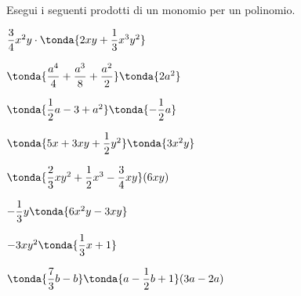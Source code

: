 \begin{esercizio}
\label{ese:10.16}
Esegui i seguenti prodotti di un monomio per un polinomio.
\begin{htmulticols}{2}
\begin{enumeratea}
\spazielenx
\item \(\dfrac{3}{4}x^{2}y\cdot\tonda{2{xy}+\dfrac{1}{3}x^{3}y^{2}}\)
\item 
\(\tonda{\dfrac{a^{4}}{4}+\dfrac{a^{3}}{8}+
\dfrac{a^{2}}{2}}\tonda{2a^{2}}\)
\item \(\tonda{\dfrac{1}{2}a-3+a^{2}}\tonda{-{\dfrac{1}{2}}a}\)
\item \(\tonda{5x+3{xy}+\dfrac{1}{2}y^{2}}\tonda{3x^{2}y}\)
\item 
\(\tonda{\dfrac{2}{3}xy^{2}+\dfrac{1}{2}x^{3}-\dfrac{3}{4}{xy}}(6{xy})\)
\item \(-\dfrac{1}{3}y\tonda{6x^{2}y-3{xy}}\)
\item \(-3xy^2\tonda{\dfrac{1}{3}x+1}\)
\item \(\tonda{\dfrac{7}{3}b-b}\tonda{a-\dfrac{1}{2}b+1}(3a-2a)\)
\end{enumeratea}
\end{htmulticols}
\end{esercizio}


\subsubsection*{}


